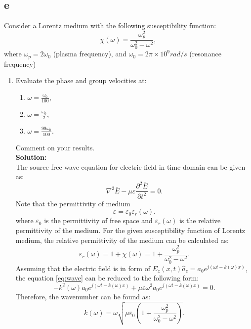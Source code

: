 \documentclass[11pt]{amsart}
\begin{document}
\subsection*{e}
Consider a Lorentz medium with the following susceptibility function:
\begin{equation*}
\chi(\omega)=\frac{\omega_{p}^{2}}{\omega_{0}^{2}-\omega^{2}},
\end{equation*}
where $\omega_p=2\omega_0$ (plasma frequency), and $\omega_0=2\pi  \times 10^9 rad/s$ (resonance frequency)
\begin{enumerate}
\item  Evaluate the phase and group velocities at: 
	\begin{enumerate}
	\item $\omega=\frac{\omega_0}{100}$,
	\item $\omega=\frac{\omega_0}{2}$,
	\item $\omega=\frac{99 \omega_0}{100}$.
	\end{enumerate}
Comment on your results.
\\
\textbf{Solution:}\\
The source free wave equation for electric field in time domain\cite{Cheng} can be given as:
\begin{equation}
\label{eq:wave}
\nabla^2 \bar{E}-\mu \varepsilon \frac{\partial^2 \bar{E}}{ \partial t^2}=0.
\end{equation}
Note that the permittivity of medium
\begin{equation}
\varepsilon=\varepsilon_0 \varepsilon_r(\omega).
\end{equation}
where $\varepsilon_0$ is the permittivity of free space and $\varepsilon_r(\omega)$ is the relative permittivity of the medium. For the given susceptibility function of Lorentz medium, the relative permittivity of the medium can be calculated as:
\begin{equation}
\varepsilon_r(\omega)=1+\chi(\omega)=1+\frac{\omega_{p}^{2}}{\omega_{0}^{2}-\omega^{2}}.
\end{equation}
Assuming that the electric field is in form of $E_z(x,t)\hat{a}_z=a_0 e^{j(\omega t - k(\omega)x)}$, the equation \ref{eq:wave} can be reduced to the following form:
\begin{equation}
-k^2(\omega)a_0 e^{j(\omega t - k(\omega)x)}+ \mu \varepsilon \omega^2 a_0 e^{j(\omega t - k(\omega)x)}=0.
\end{equation}
Therefore, the wavenumber can be found as:
\begin{equation}
k(\omega)=\omega\sqrt{\mu \varepsilon_0 (1+\frac{\omega_{p}^{2}}{\omega_{0}^{2}-\omega^{2}})}.

\end{equation}
\end{enumerate}
\end{document}
